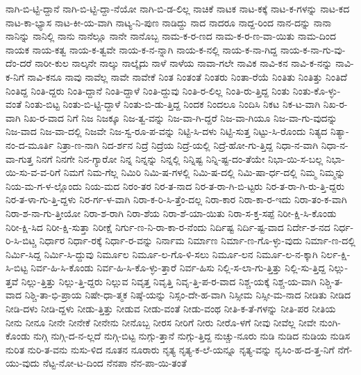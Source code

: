 {ನಾಗಿ-ಬಿ-ಟ್ಟಿ-ದ್ದಾನೆ
ನಾಗಿ-ಬಿ-ಟ್ಟಿ-ದ್ದಾ-ನೆಯೋ
ನಾಗಿ-ಬಿ-ಡ-ಲಿಲ್ಲ
ನಾಚಿಕೆ
ನಾಟಕ
ನಾಟ-ಕಕ್ಕೆ
ನಾಟ-ಕ-ಗಳನ್ನು
ನಾಟ-ಕದ
ನಾಟ-ಕಾ-ಭ್ಯಾಸ
ನಾಟ-ಕೀ-ಯ-ವಾಗಿ
ನಾಟ್ಯ-ನಿ-ಪುಣ
ನಾಡಿದ್ದು
ನಾದ
ನಾದರೂ
ನಾದ್ದ-ರಿಂದ
ನಾನ-ದನ್ನು
ನಾನಾ
ನಾನಿನ್ನು
ನಾನಿಲ್ಲಿ
ನಾನು
ನಾನೆಲ್ಲೂ
ನಾನೇ
ನಾನೊಬ್ಬ
ನಾಮ-ಕ-ರ-ಣದ
ನಾಮ-ಕ-ರ-ಣ-ವಾ-ಯಿತು
ನಾಮ-ದಿಂದ
ನಾಯಕ
ನಾಯ-ಕತ್ವ
ನಾಯ-ಕ-ತ್ವವೇ
ನಾಯ-ಕ-ನ-ನ್ನಾಗಿ
ನಾಯ-ಕ-ನಲ್ಲಿ
ನಾಯ-ಕ-ನಾ-ಗಿದ್ದ
ನಾಯ-ಕ-ನಾ-ಗು-ವು-ದೆಂ-ದರೆ
ನಾರೀ-ಕುಲ
ನಾಲ್ಕನೇ
ನಾಲ್ಕು
ನಾಲ್ಕೈದು
ನಾಳೆ
ನಾಳೆಯ
ನಾವಾ-ಗಲೇ
ನಾವಿಕ
ನಾವಿ-ಕನ
ನಾವಿ-ಕ-ನನ್ನು
ನಾವಿ-ಕ-ನಿಗೆ
ನಾವಿ-ಕನೂ
ನಾವು
ನಾವೆಲ್ಲ
ನಾವೇ
ನಾವೇಕೆ
ನಿಂತ
ನಿಂತಂತೆ
ನಿಂತರು
ನಿಂತಾ-ರೆಯೆ
ನಿಂತಿತು
ನಿಂತಿತ್ತು
ನಿಂತಿದೆ
ನಿಂತಿದ್ದ
ನಿಂತಿ-ದ್ದರು
ನಿಂತಿ-ದ್ದಾನೆ
ನಿಂತಿ-ದ್ದಾಳೆ
ನಿಂತಿ-ದ್ದುವು
ನಿಂತಿ-ರ-ಲಿಲ್ಲ
ನಿಂತಿ-ರು-ತ್ತಿದ್ದ
ನಿಂತು
ನಿಂತು-ಕೊ-ಳ್ಳು-ವಂತೆ
ನಿಂತು-ಬಿಟ್ಟ
ನಿಂತು-ಬಿ-ಟ್ಟಿ-ದ್ದಾಳೆ
ನಿಂತು-ಬಿ-ಡು-ತ್ತಿದ್ದ
ನಿಂದಕ
ನಿಂದಲೂ
ನಿಂದಿಸಿ
ನಿಕಟ
ನಿಕ-ಟ-ವಾಗಿ
ನಿಖ-ರ-ವಾಗಿ
ನಿಖ-ರ-ವಾದ
ನಿಗೆ
ನಿಜ
ನಿಜಕ್ಕೂ
ನಿಜ-ತ್ವ-ವನ್ನು
ನಿಜ-ವಾ-ಗಿ-ದ್ದರೆ
ನಿಜ-ವಾ-ಗಿಯೂ
ನಿಜ-ವಾ-ಗು-ವುದನ್ನು
ನಿಜ-ವಾದ
ನಿಜ-ವಾ-ದಲ್ಲಿ
ನಿಜವೇ
ನಿಜ-ಸ್ವ-ರೂ-ಪ-ವನ್ನು
ನಿಟ್ಟಿ-ಸಿ-ದಳು
ನಿಟ್ಟಿ-ಸುತ್ತ
ನಿಟ್ಟು-ಸಿ-ರೊಂದು
ನಿತ್ಯದ
ನಿತ್ಯಾ-ನಂ-ದ-ಮೂರ್ತಿ
ನಿತ್ರಾ-ಣ-ನಾಗಿ
ನಿದ-ರ್ಶನ
ನಿದ್ರೆ
ನಿದ್ರೆಯ
ನಿದ್ರೆ-ಯಲ್ಲಿ
ನಿದ್ರೆ-ಹೋ-ಗು-ತ್ತಿದ್ದ
ನಿಧಾ-ನ-ವಾಗಿ
ನಿಧಾ-ನ-ವಾ-ಗುತ್ತ
ನಿನಗೆ
ನಿನಗೇ
ನಿನ-ಗ್ಯಾರೋ
ನಿನ್ನ
ನಿನ್ನನ್ನು
ನಿನ್ನಲ್ಲಿ
ನಿನ್ನಿಷ್ಟ
ನಿನ್ನಿ-ಷ್ಟ-ದಂ-ತೆಯೇ
ನಿಭಾ-ಯಿ-ಸ-ಬಲ್ಲ
ನಿಭಾ-ಯಿ-ಸು-ವ-ವ-ರಿಗೆ
ನಿಮಗೆ
ನಿಮ-ಗೆಲ್ಲ
ನಿಮಿರಿ
ನಿಮಿ-ಷ-ಗಳಲ್ಲಿ
ನಿಮಿ-ಷ-ದಲ್ಲಿ
ನಿಮಿ-ಷಾ-ರ್ಧ-ದಲ್ಲಿ
ನಿಮ್ಮ
ನಿಮ್ಮನ್ನು
ನಿಯ-ಮ-ಗ-ಳ-ಲ್ಲೊಂದು
ನಿಯ-ಮದ
ನಿರಂ-ತರ
ನಿರ-ತ-ನಾದ
ನಿರ-ತ-ರಾ-ಗಿ-ಬಿ-ಟ್ಟರು
ನಿರ-ತ-ರಾ-ಗಿ-ರು-ತ್ತಿ-ದ್ದರು
ನಿರ-ತ-ಳಾ-ಗು-ತ್ತಿ-ದ್ದಳು
ನಿರ-ರ್ಗ-ಳ-ವಾಗಿ
ನಿರಾ-ಕ-ರಿ-ಸಿ-ತ್ತೆಂ-ದಲ್ಲ
ನಿರಾ-ಕಾರ
ನಿರಾ-ಕಾ-ರ-ಇದು
ನಿರಾ-ತಂ-ಕ-ವಾಗಿ
ನಿರಾ-ಶ-ನಾ-ಗು-ತ್ತೀಯೋ
ನಿರಾ-ಶ-ರಾಗಿ
ನಿರಾ-ಶೆಯ
ನಿರಾ-ಶೆ-ಯಾ-ಯಿತು
ನಿರಾ-ಸ-ಕ್ತ-ಸಪ್ಪೆ
ನಿರೀ-ಕ್ಷಿ-ಸಿ-ಕೊಂಡು
ನಿರೀ-ಕ್ಷಿ-ಸಿದ
ನಿರೀ-ಕ್ಷಿ-ಸುತ್ತಾ
ನಿರೀಕ್ಷೆ
ನಿರ್ಗು-ಣ-ನಿ-ರಾ-ಕಾ-ರ-ನೆಂದು
ನಿರ್ದಿಷ್ಟ
ನಿರ್ದಿ-ಷ್ಟ-ವಾದ
ನಿರ್ದೇ-ಶ-ನದ
ನಿರ್ಧ-ರಿ-ಸಿ-ಬಿಟ್ಚ
ನಿರ್ಧಾರ
ನಿರ್ಧಾ-ರಕ್ಕೆ
ನಿರ್ಧಾ-ರ-ವನ್ನು
ನಿರ್ನಾಮ
ನಿರ್ಮಾಣ
ನಿರ್ಮಾ-ಣ-ಗೊ-ಳ್ಳು-ವುದು
ನಿರ್ಮಾ-ಣ-ದಲ್ಲಿ
ನಿರ್ಮಿ-ಸಿದ್ದ
ನಿರ್ಮಿ-ಸಿ-ದ್ದುವು
ನಿರ್ಮೂಲ
ನಿರ್ಮೂ-ಲ-ಗೊ-ಳಿ-ಸಲು
ನಿರ್ಮೂ-ಲನ
ನಿರ್ಮೂ-ಲ-ನ-ಕ್ಕಾಗಿ
ನಿರ್ಲ-ಕ್ಷಿ-ಸಿ-ಬಿಟ್ಟ
ನಿರ್ವ-ಹಿ-ಸಿ-ಕೊಂಡು
ನಿರ್ವ-ಹಿ-ಸಿ-ಕೊ-ಳ್ಳು-ತ್ತಾರೆ
ನಿರ್ವ-ಹಿಸು
ನಿಲ್ಲಿ-ಸ-ಲಾ-ಗು-ತ್ತಿತ್ತು
ನಿಲ್ಲಿ-ಸು-ತ್ತಿದ್ದ
ನಿಲ್ಲು-ತ್ತವೆ
ನಿಲ್ಲು-ತ್ತಿತ್ತು
ನಿಲ್ಲು-ತ್ತಿ-ದ್ದರು
ನಿಲ್ಲುವ
ನಿವೃತ್ತ
ನಿವೃತ್ತಿ
ನಿವೃ-ತ್ತಿ-ಪ-ರ-ವಾದ
ನಿಶ್ಚ-ಯಕ್ಕೆ
ನಿಶ್ಚ-ಯ-ವಾಗಿ
ನಿಶ್ಚಿ-ತ-ವಾದ
ನಿಶ್ಚಿ-ತಾ-ಭಿ-ಪ್ರಾಯ
ನಿಷೇ-ಧಾ-ತ್ಮಕ
ನಿಷ್ಠೆ-ಯನ್ನು
ನಿಸ್ಸಂ-ದೇ-ಹ-ವಾಗಿ
ನಿಸ್ಸೀಮ
ನಿಸ್ಸೀ-ಮ-ನಾದ
ನೀಡಿತು
ನೀಡಿದ
ನೀಡಿ-ದಳು
ನೀಡಿ-ದ್ದಳು
ನೀಡು-ತ್ತಿತ್ತು
ನೀಡುವ
ನೀಡು-ವಂತೆ
ನೀಡು-ವಂಥ
ನೀತಿ-ಕ-ತೆ-ಗಳನ್ನು
ನೀತಿ-ಪರ
ನೀತಿಯ
ನೀನು
ನೀನೂ
ನೀನೇ
ನೀನೇಕೆ
ನೀನೇನು
ನೀನೊಬ್ಬ
ನೀರಸ
ನೀರಿಗೆ
ನೀರು
ನೀರೊ-ಳಗೆ
ನೀವು
ನೀವೆಲ್ಲ
ನೀವೇ
ನುಂಗಿ-ಕೊಂಡು
ನುಗ್ಗಿ
ನುಗ್ಗಿ-ದ-ನ-ಲ್ಲದೆ
ನುಗ್ಗಿ-ಬಿಟ್ಟ
ನುಗ್ಗು-ತ್ತಾನೆ
ನುಗ್ಗು-ತ್ತಿದ್ದ
ನುಚ್ಚು-ನೂರು
ನುಡಿ
ನುಡಿದ
ನುಡಿಯ
ನುಡಿಸ
ನುರಿತ
ನುರಿ-ತ-ವನು
ನುಸು-ಳಿದ
ನೂತನ
ನೂರಾರು
ನೃತ್ಯ
ನೃತ್ಯ-ಕ-ಲೆ-ಯನ್ನೂ
ನೃತ್ಯ-ವನ್ನು
ನೃಸಿಂ-ಹ-ದ-ತ್ತ-ನಿಗೆ
ನೆಗೆ-ಯು-ವುದು
ನೆಟ್ಟ-ನೋ-ಟ-ದಿಂದ
ನೆನಪಾ
ನೆನ-ಪಾ-ಯಿ-ತಂತೆ
}
